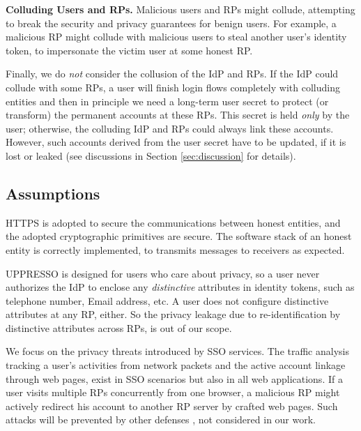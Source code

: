 \noindent \textbf{Colluding Users and RPs.}
Malicious users and RPs might collude,
 attempting to break the security and privacy guarantees for benign users.
For example, a malicious RP might collude with malicious users to steal another user's identity token,
    to impersonate the victim user at some honest RP.

Finally, we do \emph{not} consider the collusion of the IdP and RPs.
    If the IdP could collude with some RPs,
        a user will finish login flows completely with colluding entities
        and then in principle we need a long-term user secret to protect (or transform) the permanent accounts at these RPs.
This secret is held \emph{only} by the user;
    otherwise, the colluding IdP and RPs could always link these accounts.
However, such accounts derived from the user secret have to be updated,
    if it is lost or leaked
    (see discussions in Section \ref{sec:discussion} for details).

\subsection{Assumptions}
HTTPS is adopted to secure the communications between honest entities,
 and the adopted cryptographic primitives are secure.
The software stack of an honest entity is correctly implemented,
     to transmits messages to receivers as expected.

UPPRESSO is designed for users who care about privacy,
so a user never authorizes the IdP to enclose any \emph{distinctive} attributes in identity tokens,
 such as telephone number, Email address, etc.
A user does not configure  distinctive attributes at any RP, either.
So the privacy leakage due to re-identification by distinctive attributes across RPs,
    is out of our scope.

We focus on the privacy threats introduced by SSO services.
The traffic analysis tracking a user's activities from network packets
    and the active account linkage through web pages,
        exist in SSO scenarios but also in all web applications.
If a user visits multiple RPs concurrently from one browser,
        a malicious RP might actively redirect his account to another RP server by crafted web pages.
Such attacks will be prevented by other defenses \cite{FedCM},
    not considered in our work.

